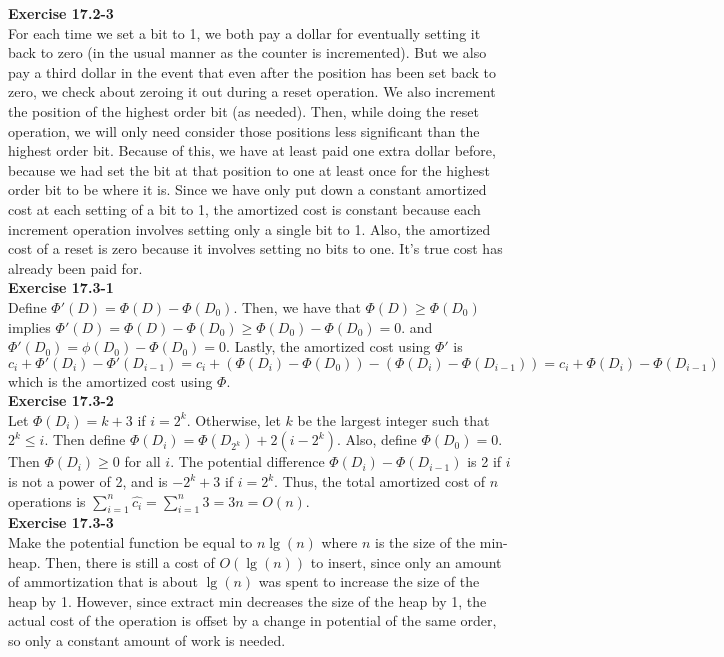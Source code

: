 \documentclass{article}
\begin{document}
\noindent\textbf{Exercise 17.2-3}\\

For each time we set a bit to 1, we both pay a dollar for eventually setting it back to zero (in the usual manner as the counter is incremented). But we also pay a third dollar in the event that even after the position has been set back to zero, we check about zeroing it out during a reset operation. We also increment the position of the highest order bit (as needed). Then, while doing the reset operation, we will only need consider those positions less significant than the highest order bit. Because of this, we have at least paid one extra dollar before, because we had set the bit at that position to one at least once for the highest order bit to be where it is. Since we have only put down a constant amortized cost at each setting of a bit to 1, the amortized cost is constant because each increment operation involves setting only a single bit to 1. Also, the amortized cost of a reset is zero because it involves setting no bits to one. It's true cost has already been paid for.\\

\noindent\textbf{Exercise 17.3-1}\\

Define $\Phi'(D) = \Phi(D) -\Phi(D_0)$. Then, we have that $\Phi(D) \ge \Phi(D_0)$ implies $\Phi'(D)  = \Phi(D) - \Phi(D_0) \ge \Phi(D_0) -\Phi(D_0) = 0$. and $\Phi'(D_0) = \phi(D_0)-\Phi(D_0) = 0$. Lastly, the amortized cost using $\Phi'$ is $c_i + \Phi'(D_i) -\Phi'(D_{i-1}) = c_i + (\Phi(D_i) - \Phi(D_0)) - (\Phi(D_i) -\Phi(D_{i-1})) = c_i + \Phi(D_i) -\Phi(D_{i-1})$ which is the amortized cost using $\Phi$.\\

\noindent\textbf{Exercise 17.3-2}\\

Let $\Phi(D_i) = k+3$ if $i =  2^k$.  Otherwise, let $k$ be the largest integer such that $2^k \leq i$.  Then define $\Phi(D_i) = \Phi(D_{2^k}) + 2(i-2^k)$.   Also, define $\Phi(D_0) = 0$.  Then $\Phi(D_i) \geq 0$ for all $i$.  The potential difference $\Phi(D_i) - \Phi(D_{i-1})$ is 2 if $i$ is not a power of 2, and is $-2^k + 3$ if $i=2^k$.   Thus, the total amortized cost of $n$ operations is $\sum_{i=1}^n \hat{c_i} = \sum_{i=1}^n 3 = 3n = O(n)$.  \\


\noindent\textbf{Exercise 17.3-3}\\

Make the potential function be equal to $n\lg(n)$ where $n$ is the size of the min-heap. Then, there is still a cost of $O(\lg(n))$ to insert, since only an amount of ammortization that is about $\lg(n)$ was spent to increase the size of the heap by 1. However, since extract min decreases the size of the heap by 1, the actual cost of the operation is offset by a change in potential of the same order, so only a constant amount of work is needed.\\
 
\end{document}
